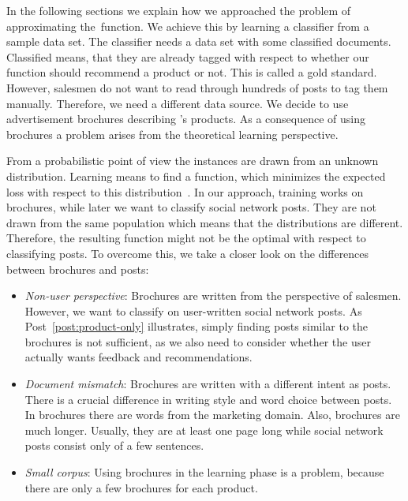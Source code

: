 In the following sections we explain how we approached the problem of approximating the~\nto function.
We achieve this by learning a classifier from a sample data set.
The classifier needs a data set with some classified documents.
Classified means, that they are already tagged with respect to whether our \nto function should recommend a product or not.
This is called a gold standard.
However, salesmen do not want to read through hundreds of posts to tag them manually.
Therefore, we need a different data source.
We decide to use advertisement brochures describing \acme's products.
As a consequence of using brochures a problem arises from the theoretical learning perspective.

From a probabilistic point of view the instances are drawn from an unknown distribution.
Learning means to find a function, which minimizes the expected loss with respect to this distribution~\cite{trafalis2000support}.
In our approach, training works on brochures, while later we want to classify social network posts.
They are not drawn from the same population which means that the distributions are different.
Therefore, the resulting function might not be the optimal with respect to classifying posts.
To overcome this, we take a closer look on the differences between brochures and posts:

 \begin{itemize}
 	\item
		\emph{Non-user perspective}:
		Brochures are written from the perspective of salesmen.
		However, we want to classify on user-written social network posts.
		As Post~\ref{post:product-only} illustrates, simply finding posts similar to the brochures is not sufficient, as we also need to consider whether the user actually wants feedback and recommendations.
	\item
		\emph{Document mismatch}:
		Brochures are written with a different intent as posts.
		There is a crucial difference in writing style and word choice between posts.
		In brochures there are words from the marketing domain.
		Also, brochures are much longer.
		Usually, they are at least one page long while social network posts consist only of a few sentences.
	\item
		\emph{Small corpus}:
		Using brochures in the learning phase is a problem, because there are only a few brochures for each product.
 \end{itemize}
